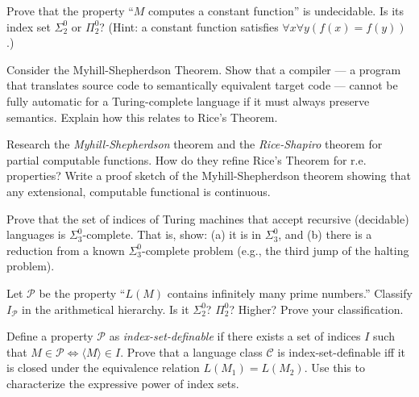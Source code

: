 \begin{exercise}[Intermediate]
Prove that the property ``$M$ computes a constant function'' is undecidable. Is its index set $\Sigma^0_2$ or $\Pi^0_2$? (Hint: a constant function satisfies $\forall x \forall y (f(x) = f(y))$.)
\end{exercise}

\begin{exercise}[Intermediate]
Consider the Myhill-Shepherdson Theorem. Show that a compiler --- a program that translates source code to semantically equivalent target code --- cannot be fully automatic for a Turing-complete language if it must always preserve semantics. Explain how this relates to Rice's Theorem.
\end{exercise}

\begin{exercise}[Advanced]
Research the \emph{Myhill-Shepherdson} theorem and the \emph{Rice-Shapiro} theorem for partial computable functions. How do they refine Rice's Theorem for r.e. properties? Write a proof sketch of the Myhill-Shepherdson theorem showing that any extensional, computable functional is continuous.
\end{exercise}

\begin{exercise}[Advanced]
Prove that the set of indices of Turing machines that accept recursive (decidable) languages is $\Sigma^0_3$-complete. That is, show: (a) it is in $\Sigma^0_3$, and (b) there is a reduction from a known $\Sigma^0_3$-complete problem (e.g., the third jump of the halting problem).
\end{exercise}

\begin{exercise}[Advanced]
Let $\mathcal{P}$ be the property ``$L(M)$ contains infinitely many prime numbers.'' Classify $I_\mathcal{P}$ in the arithmetical hierarchy. Is it $\Sigma^0_2$? $\Pi^0_2$? Higher? Prove your classification.
\end{exercise}

\begin{exercise}[Advanced]
Define a property $\mathcal{P}$ as \emph{index-set-definable} if there exists a set of indices $I$ such that $M \in \mathcal{P} \iff \langle M \rangle \in I$. Prove that a language class $\mathcal{C}$ is index-set-definable iff it is closed under the equivalence relation $L(M_1) = L(M_2)$. Use this to characterize the expressive power of index sets.
\end{exercise}

